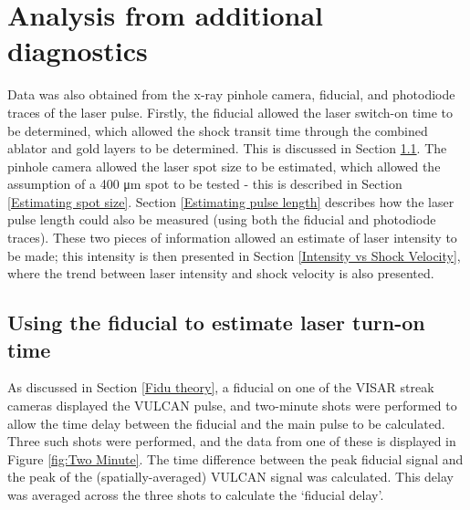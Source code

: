\section{Analysis from additional diagnostics} \label{Other diagnostic analysis}

Data was also obtained from the x-ray pinhole camera, fiducial, and photodiode traces of the laser pulse. Firstly, the fiducial allowed the laser switch-on time to be determined, which allowed the shock transit time through the combined ablator and gold layers to be determined. This is discussed in Section \ref{Fidu for coating transit}. The pinhole camera allowed the laser spot size to be estimated, which allowed the assumption of a 400 \unit{\micro\meter} spot to be tested - this is described in Section \ref{Estimating spot size}. Section \ref{Estimating pulse length} describes how the laser pulse length could also be measured (using both the fiducial and photodiode traces). These two pieces of information allowed an estimate of laser intensity to be made; this intensity is then presented in Section \ref{Intensity vs Shock Velocity}, where the trend between laser intensity and shock velocity is also presented. 



\subsection{Using the fiducial to estimate laser turn-on time} \label{Fidu for coating transit}
As discussed in Section \ref{Fidu theory}, a fiducial on one of the VISAR streak cameras displayed the VULCAN pulse, and two-minute shots were performed to allow the time delay between the fiducial and the main pulse to be calculated. Three such shots were performed, and the data from one of these is displayed in Figure \ref{fig:Two Minute}. The time difference between the peak fiducial signal and the peak of the (spatially-averaged) VULCAN signal was calculated. This delay was averaged across the three shots to calculate the `fiducial delay'. 

